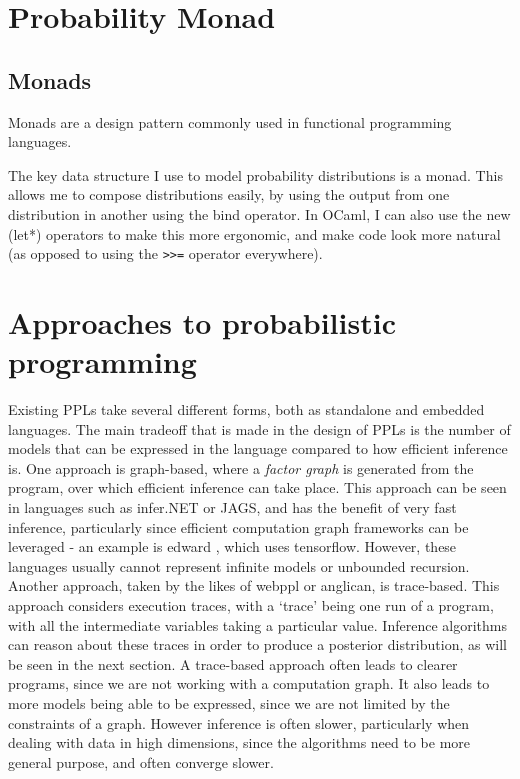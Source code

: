 \section{Probability Monad}

\subsection{Monads}

Monads are a design pattern commonly used in functional programming languages.

The key data structure I use to model probability distributions is a monad. This allows me to compose distributions easily, by using the output from one distribution in another using the bind operator. In OCaml, I can also use the new (let*) operators to make this more ergonomic, and make code look more natural (as opposed to using the \texttt{>>=} operator everywhere).

\section{Approaches to probabilistic programming}
Existing PPLs take several different forms, both as standalone and embedded languages. The main tradeoff that is made in the design of PPLs is the number of models that can be expressed in the language compared to how efficient inference is. One approach is graph-based, where a \textit{factor graph} is generated from the program, over which efficient inference can take place. This approach can be seen in languages such as infer.NET or JAGS, and has the benefit of very fast inference, particularly since efficient computation graph frameworks can be leveraged - an example is edward \cite{}, which uses tensorflow. However, these languages usually cannot represent infinite models or unbounded recursion. Another approach, taken by the likes of webppl or anglican, is trace-based. This approach considers execution traces, with a `trace' being one run of a program, with all the intermediate variables taking a particular value. Inference algorithms can reason about these traces in order to produce a posterior distribution, as will be seen in the next section. A trace-based approach often leads to clearer programs, since we are not working with a computation graph. It also leads to more models being able to be expressed, since we are not limited by the constraints of a graph. However inference is often slower, particularly when dealing with data in high dimensions, since the algorithms need to be more general purpose, and often converge slower.

